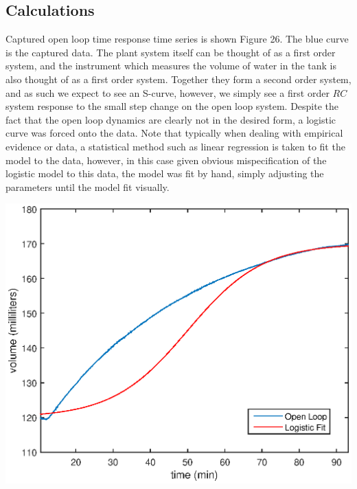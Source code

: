 \documentclass{article}
\begin{document}
\subsection{Calculations}
\begin{minipage}{0.45\textwidth}
Captured open loop time response time series is shown Figure 26. The blue curve is the captured data. The plant system itself can be thought of as a first order system, and the instrument which measures the volume of water in the tank is also thought of as a first order system. Together they form a second order system, and as such we expect to see an S-curve, however, we simply see a first order $RC$ system response to the small step change on the open loop system. Despite the fact that the open loop dynamics are clearly not in the desired form, a logistic curve was forced onto the data. Note that typically when dealing with empirical evidence or data, a statistical method such as linear regression is taken to fit the model to the data, however, in this case given obvious mispecification of the logistic model to this data, the model was fit by hand, simply adjusting the parameters until the model fit visually.
\end{minipage}
\hspace{1cm}
\begin{minipage}{0.45\textwidth}
	\centering
	\includegraphics[scale=0.55]{scurve}
\end{minipage}
\end{document}
